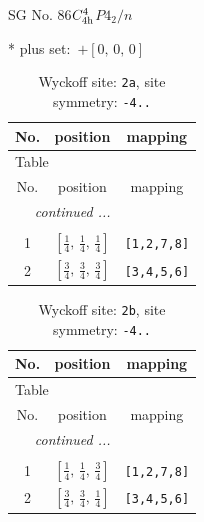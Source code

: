 \documentclass[fleqn,8pt]{jsarticle}
\begin{document}
\setcounter{MaxMatrixCols}{32}

\renewcommand{\tablename}{Table~}
\renewcommand{\figurename}{Figure~}
\begin{center}
\LARGE
SG No. 86\quad$C_{\rm 4h}^{4}$\quad$P4_2/n$\quad[ tetragonal ]
\end{center}
* plus set:\,\,\,$+\left[ 0,\, 0,\, 0 \right]$
\renewcommand{\arraystretch}{1.2}
\begin{longtable}{ccc}
\caption{Wyckoff site: {\tt 2a}, site symmetry: {\tt -4..}}
 \\
 \hline \hline
No. & position & mapping \\ \hline \endfirsthead

\multicolumn{2}{l}{\tablename\ \thetable{}} \\
 \hline \hline
No. & position & mapping \\ \hline \endhead

 \hline \hline
\multicolumn{2}{r}{\footnotesize\it continued ...} \\ \endfoot

 \hline \hline
\multicolumn{2}{r}{} \\ \endlastfoot

1 & $\left[ \frac{1}{4},\, \frac{1}{4},\, \frac{1}{4} \right]$ & {\tt [1,2,7,8]} \\ \hline
2 & $\left[ \frac{3}{4},\, \frac{3}{4},\, \frac{3}{4} \right]$ & {\tt [3,4,5,6]} \\
\end{longtable}
\renewcommand{\arraystretch}{1.2}
\begin{longtable}{ccc}
\caption{Wyckoff site: {\tt 2b}, site symmetry: {\tt -4..}}
 \\
 \hline \hline
No. & position & mapping \\ \hline \endfirsthead

\multicolumn{2}{l}{\tablename\ \thetable{}} \\
 \hline \hline
No. & position & mapping \\ \hline \endhead

 \hline \hline
\multicolumn{2}{r}{\footnotesize\it continued ...} \\ \endfoot

 \hline \hline
\multicolumn{2}{r}{} \\ \endlastfoot

1 & $\left[ \frac{1}{4},\, \frac{1}{4},\, \frac{3}{4} \right]$ & {\tt [1,2,7,8]} \\ \hline
2 & $\left[ \frac{3}{4},\, \frac{3}{4},\, \frac{1}{4} \right]$ & {\tt [3,4,5,6]} \\
\end{longtable}
\end{document}
